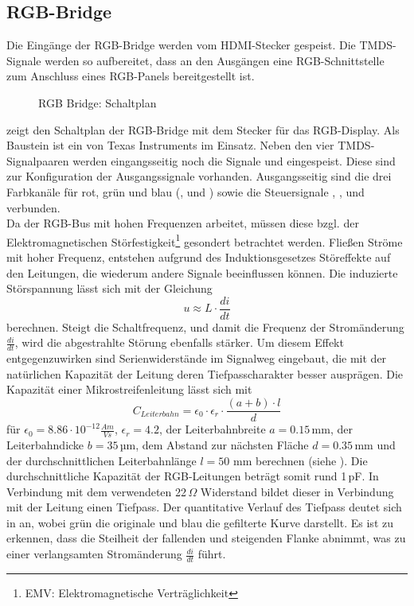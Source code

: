 \subsection{RGB-Bridge}
Die Eingänge der RGB-Bridge werden vom HDMI-Stecker gespeist. Die TMDS-Signale werden so aufbereitet, dass an den Ausgängen eine RGB-Schnittstelle zum Anschluss eines RGB-Panels bereitgestellt ist.
        \begin{figure}[htp]
        	\center
            \caption{RGB Bridge: Schaltplan}
            \label{fig:teilb_rgb_bridge_sch}
        \end{figure}
 zeigt den Schaltplan der RGB-Bridge mit dem Stecker für das RGB-Display. Als Baustein ist ein  von Texas Instruments im Einsatz. Neben den vier TMDS-Signalpaaren werden eingangsseitig noch die Signale  und  eingespeist. Diese sind zur Konfiguration der Ausgangssignale vorhanden. Ausgangsseitig sind die drei Farbkanäle für rot, grün und blau (,  und ) sowie die Steuersignale , ,  und  verbunden. \\
Da der RGB-Bus mit hohen Frequenzen arbeitet, müssen diese bzgl. der Elektromagnetischen Störfestigkeit\footnote{EMV: Elektromagnetische Verträglichkeit} gesondert betrachtet werden. Fließen Ströme mit hoher Frequenz, entstehen aufgrund des Induktionsgesetzes Störeffekte auf den Leitungen, die wiederum andere Signale beeinflussen können. Die induzierte Störspannung lässt sich mit der Gleichung
%
\begin{equation}
u \approx L \cdot \frac{di}{dt}
\label{equ:induzierte_spannung}
\end{equation}
%
berechnen. Steigt die Schaltfrequenz, und damit die Frequenz der Stromänderung $\frac{di}{dt}$, wird die abgestrahlte Störung ebenfalls stärker. Um diesem Effekt entgegenzuwirken sind Serienwiderstände im Signalweg eingebaut, die mit der natürlichen Kapazität der Leitung deren Tiefpasscharakter besser ausprägen. Die Kapazität einer Mikrostreifenleitung lässt sich mit 
%
\begin{equation}
C_{Leiterbahn} = \epsilon_0 \cdot \epsilon_r \cdot \frac{(a+b) \cdot l}{d}
\label{equ:c_leiterbahn}
\end{equation}
%
für $\epsilon_0 = 8.86\cdot10^{-12} \frac{Am}{Vs}$, $\epsilon_r = 4.2$, der Leiterbahnbreite $a = 0.15 $\,mm, der Leiterbahndicke $b = 35$\,µm, dem Abstand zur nächsten Fläche $d = 0.35$\,mm und der durchschnittlichen Leiterbahnlänge $l = 50$ mm berechnen (siehe \cite{Gensicke2014}). Die durchschnittliche Kapazität der RGB-Leitungen beträgt somit rund 1\,pF. In Verbindung mit dem verwendeten 22\,$\Omega$ Widerstand bildet dieser in Verbindung mit der Leitung einen Tiefpass. Der quantitative Verlauf des Tiefpass deutet sich in  an, wobei grün die originale und blau die gefilterte Kurve darstellt. Es ist zu erkennen, dass die Steilheit der fallenden und steigenden Flanke abnimmt, was zu einer verlangsamten Stromänderung $\frac{di}{dt}$ führt.
